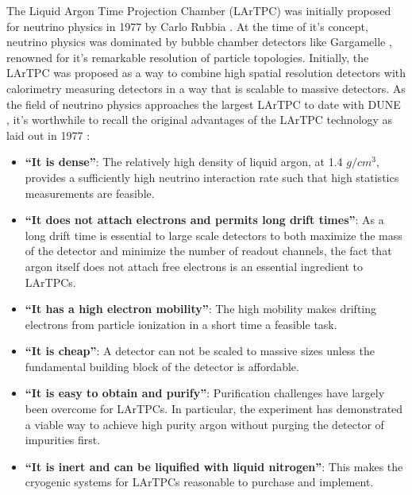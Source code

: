 The Liquid Argon Time Projection Chamber (LArTPC) was initially proposed for neutrino physics in 1977 by Carlo Rubbia \cite{Rubbia:1977zz}.  At the time of it's concept, neutrino physics was dominated by bubble chamber detectors like Gargamelle \cite{Musset:1978gf}, renowned for it's remarkable resolution of particle topologies.  Initially, the LArTPC was proposed as a way to combine high spatial resolution detectors with calorimetry measuring detectors in a way that is scalable to massive detectors.  As the field of neutrino physics approaches the largest LArTPC to date with DUNE \cite{DUNE}, it's worthwhile to recall the original advantages of the LArTPC technology as laid out in 1977 \cite{Rubbia:1977zz}:

\begin{itemize}

\item{\bf ``It is dense''}: The relatively high density of liquid argon, at 1.4 $g/cm^3$, provides a sufficiently high neutrino interaction rate such that high statistics measurements are feasible.

\item{\bf ``It does not attach electrons and permits long drift times''}: As a long drift time is essential to large scale detectors to both maximize the mass of the detector and minimize the number of readout channels, the fact that argon itself does not attach free electrons is an essential ingredient to LArTPCs.

\item{\bf ``It has a high electron mobility''}: The high mobility makes drifting electrons from particle ionization in a short time a feasible task.

\item{\bf ``It is cheap''}:  A detector can not be scaled to massive sizes unless the fundamental building block of the detector is affordable.

\item{\bf ``It is easy to obtain and purify''}: Purification challenges have largely been overcome for LArTPCs.  In particular, the \uboone experiment has demonstrated a viable way to achieve high purity argon without purging the detector of impurities first.

\item{\bf ``It is inert and can be liquified with liquid nitrogen''}: This makes the cryogenic systems for LArTPCs reasonable to purchase and implement.

\end{itemize}

